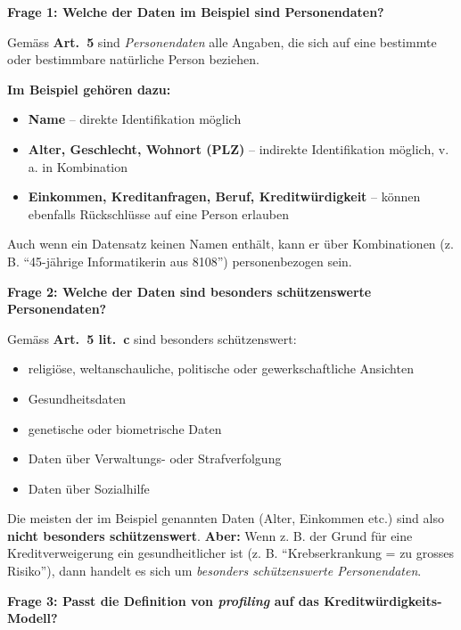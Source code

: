 \begin{aufgabe}{2}

\textbf{Frage 1: Welche der Daten im Beispiel sind Personendaten?}

Gemäss \textbf{Art.\ 5} sind \emph{Personendaten} alle Angaben, die sich auf eine bestimmte oder bestimmbare natürliche Person beziehen.

\textbf{Im Beispiel gehören dazu:}

\begin{itemize}
  \item \textbf{Name} – direkte Identifikation möglich
  \item \textbf{Alter, Geschlecht, Wohnort (PLZ)} – indirekte Identifikation möglich, v. a. in Kombination
  \item \textbf{Einkommen, Kreditanfragen, Beruf, Kreditwürdigkeit} – können ebenfalls Rückschlüsse auf eine Person erlauben
\end{itemize}

Auch wenn ein Datensatz keinen Namen enthält, kann er über Kombinationen (z. B. ``45-jährige Informatikerin aus 8108'') personenbezogen sein.

\vspace{0.5em}
\textbf{Frage 2: Welche der Daten sind besonders schützenswerte Personendaten?}

Gemäss \textbf{Art.\ 5 lit.\ c} sind besonders schützenswert:

\begin{itemize}
  \item religiöse, weltanschauliche, politische oder gewerkschaftliche Ansichten
  \item Gesundheitsdaten
  \item genetische oder biometrische Daten
  \item Daten über Verwaltungs- oder Strafverfolgung
  \item Daten über Sozialhilfe
\end{itemize}

Die meisten der im Beispiel genannten Daten (Alter, Einkommen etc.) sind also \textbf{nicht besonders schützenswert}.  \textbf{Aber:} Wenn z. B. der Grund für eine Kreditverweigerung ein gesundheitlicher ist (z. B. ``Krebserkrankung = zu grosses Risiko''), dann handelt es sich um \emph{besonders schützenswerte Personendaten}.

\vspace{0.5em}
\textbf{Frage 3: Passt die Definition von \textit{profiling} auf das Kreditwürdigkeits-Modell?}


\end{aufgabe}
